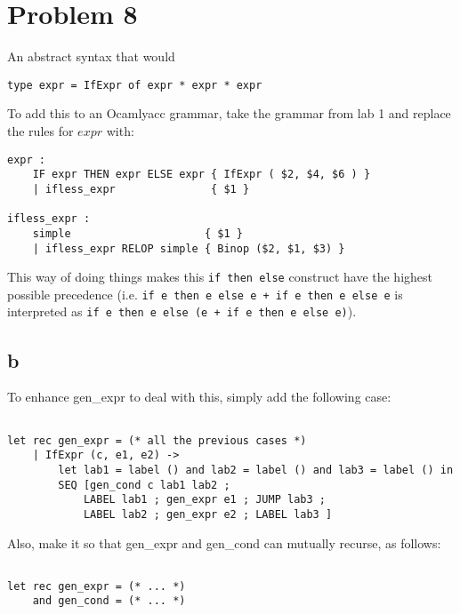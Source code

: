 \section{Problem 8}

An abstract syntax that would 

\begin{lstlisting}[language=Ml]
type expr = IfExpr of expr * expr * expr
\end{lstlisting}

To add this to an Ocamlyacc grammar, take the grammar from lab 1 and replace the rules for $expr$ with:
\begin{lstlisting}[language=Ml]
expr :
    IF expr THEN expr ELSE expr { IfExpr ( $2, $4, $6 ) }
    | ifless_expr               { $1 }

ifless_expr :
    simple                     { $1 }
    | ifless_expr RELOP simple { Binop ($2, $1, $3) } 

\end{lstlisting}

This way of doing things makes this \texttt{if then else} construct have the highest possible precedence (i.e. \texttt{if e then e else e + if e then e else e} is interpreted as \texttt{if e then e else (e + if e then e else e)}).

\subsection{b}

To enhance gen\_expr to deal with this, simply add the following case:

\begin{lstlisting}[language=Ml]

let rec gen_expr = (* all the previous cases *)
    | IfExpr (c, e1, e2) -> 
        let lab1 = label () and lab2 = label () and lab3 = label () in
        SEQ [gen_cond c lab1 lab2 ;
            LABEL lab1 ; gen_expr e1 ; JUMP lab3 ;
            LABEL lab2 ; gen_expr e2 ; LABEL lab3 ]
\end{lstlisting}

Also, make it so that gen\_expr and gen\_cond can mutually recurse, as follows:

\begin{lstlisting}[language=Ml]

let rec gen_expr = (* ... *)
    and gen_cond = (* ... *)

\end{lstlisting}

